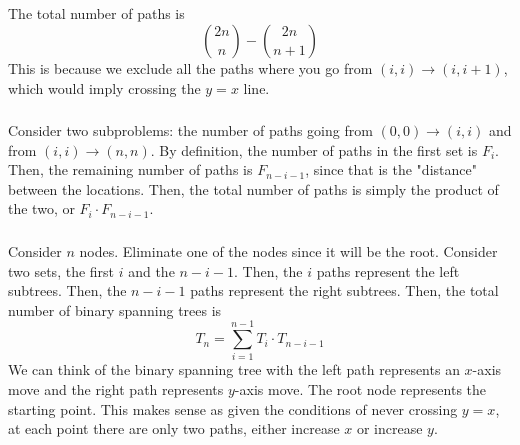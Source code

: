 \documentclass{article}
\newtheorem{theorem}{Theorem}
\begin{document}
\subsection{}

\subsubsection{}

The total number of paths is
\begin{equation}
    \binom{2n}{n} - \binom{2n}{n + 1}
\end{equation}
This is because we exclude all the paths where you go from \((i, i) \to (i, i + 1)\), which would imply crossing the \(y = x\) line.

\subsubsection{}

Consider two subproblems: the number of paths going from \((0, 0) \to (i, i)\) and from \((i, i) \to (n, n)\).
By definition, the number of paths in the first set is \(F_i\).
Then, the remaining number of paths is \(F_{n - i - 1}\), since that is the "distance" between the locations.
Then, the total number of paths is simply the product of the two, or \(F_i \cdot F_{n - i - 1}\).

\subsubsection{}

Consider \(n\) nodes.
Eliminate one of the nodes since it will be the root.
Consider two sets, the first \(i\) and the \(n - i - 1\).
Then, the \(i\) paths represent the left subtrees.
Then, the \(n - i - 1\) paths represent the right subtrees.
Then, the total number of binary spanning trees is
\begin{equation}
    T_n = \sum_{i = 1}^{n - 1} T_i \cdot T_{n - i - 1}
\end{equation}
We can think of the binary spanning tree with the left path represents an \(x\)-axis move and the right path represents \(y\)-axis move.
The root node represents the starting point.
This makes sense as given the conditions of never crossing \(y = x\), at each point there are only two paths, either increase \(x\) or increase \(y\).
\end{document}
